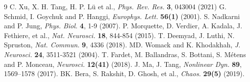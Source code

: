 \documentclass[%
 aip,
 amsmath,amssymb,
 reprint,%
]{revtex4-1}
\begin{document}
\begin{thebibliography}{9}
		 C. Xu, X. H. Tang, H. P. Lü et al., \textit{Phys. Rev. Res.} \textbf{3}, 043004 (2021)
		 G. Schmid, I. Goychuk and P. Hanggi, \textit{Europhys. Lett.} \textbf{56(1)} (2001).
		 S. Nadkarni and P. Jung, \textit{Phys. Biol.} \textbf{4}, 1-9 (2007).
		 P. Morquette, D. Verdier, A. Kadala, J. Fethiere, et al., \textit{Nat. Neurosci.} \textbf{18}, 844-854 (2015).
		 T. Deemyad, J. Luthi, N. Spruston, \textit{Nat. Commun.} \textbf{9}, 4336 (2018).
		 MD. Womack and K. Khodakhah, \textit{J. Neurosci.} \textbf{24}, 3511-3521 (2004).
		 T. Fardet, M. Ballandras, S. Bottani, S. Métens and P. Monceau, \textit{Neurosci.} \textbf{12(41)} (2018).
		 J. Ma, J. Tang,  \textit{Nonlinear Dyn.} \textbf{89}, 1569–1578 (2017).
		 BK. Bera, S. Rakshit, D. Ghosh, et al., \textit{Chaos.} \textbf{29(5)} (2019).
          
				
		
		
		
		
		
		
	\end{thebibliography}
	
	
	
\end{document}
